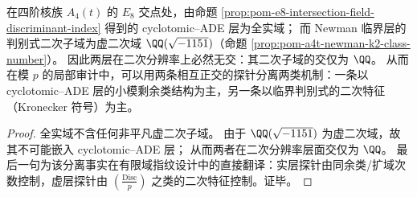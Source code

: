 \begin{corollary}[\texorpdfstring{$q=4$}{q=4} 的 cyclotomic--ADE 层与 Newman--临界层在二次分辨率上的实/虚分离]\label{cor:pom-q4-arithmetic-two-layer-real-imag}
在四阶核族 \(A_4(t)\) 的 \(E_8\) 交点处，由命题 \ref{prop:pom-e8-intersection-field-discriminant-index} 得到的 cyclotomic--ADE 层为全实域；
而 Newman 临界层的判别式二次子域为虚二次域 \(\QQ(\sqrt{-1151})\)（命题 \ref{prop:pom-a4t-newman-k2-class-number}）。
因此两层在二次分辨率上必然无交：其二次子域的交仅为 \(\QQ\)。
从而在模 \(p\) 的局部审计中，可以用两条相互正交的探针分离两类机制：一条以 cyclotomic--ADE 层的小模剩余类结构为主，另一条以临界判别式的二次特征（Kronecker 符号）为主。
\end{corollary}
\begin{proof}
全实域不含任何非平凡虚二次子域。
由于 \(\QQ(\sqrt{-1151})\) 为虚二次域，故其不可能嵌入 cyclotomic--ADE 层；
从而两者在二次分辨率层面交仅为 \(\QQ\)。
最后一句为该分离事实在有限域指纹设计中的直接翻译：实层探针由同余类/扩域次数控制，虚层探针由 \(\left(\frac{\mathrm{Disc}}{p}\right)\) 之类的二次特征控制。证毕。
\end{proof}

